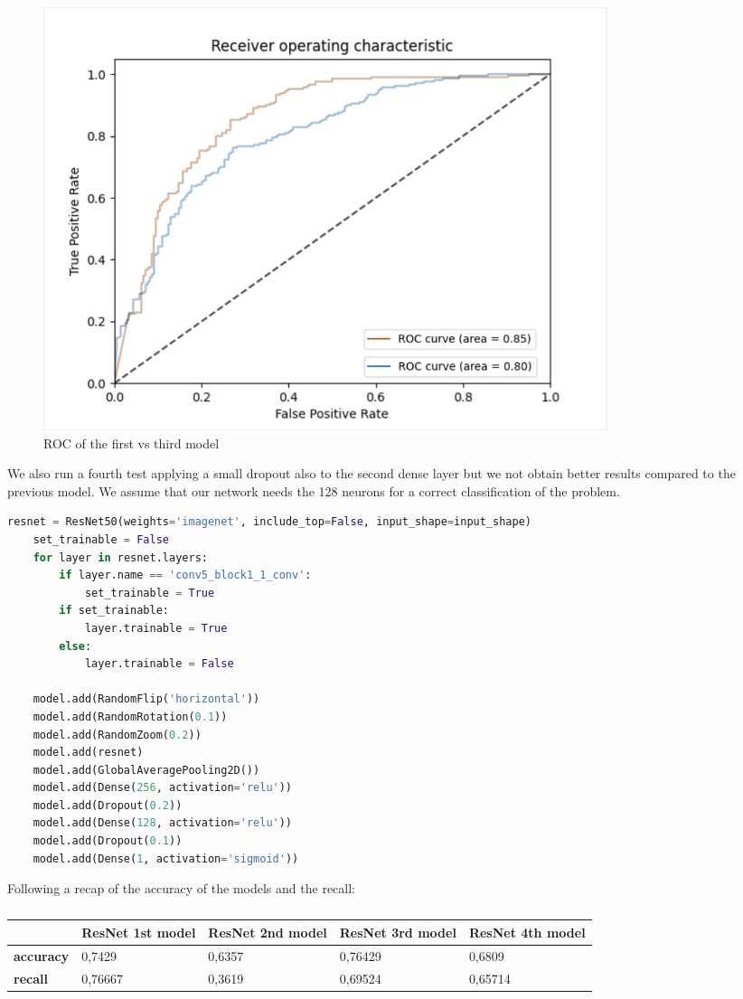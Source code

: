 \begin{figure}[h!]
    \centering
    \includegraphics[width=0.8\textwidth]{images/ROCResnet.png}
    \caption{ROC of the first vs third model}
    \label{fig:ROCResnet}
\end{figure}


We also run a fourth test applying a small dropout also to the second dense layer but we not obtain better results compared to the previous model. We assume that our network needs the 128 neurons for a correct classification of the problem. 
\begin{lstlisting}[language=python, caption={ResNet50 Fourth test}, label={lst:resnet50CodeFourthTest}]
    resnet = ResNet50(weights='imagenet', include_top=False, input_shape=input_shape)
    set_trainable = False
    for layer in resnet.layers:
        if layer.name == 'conv5_block1_1_conv':
            set_trainable = True
        if set_trainable:
            layer.trainable = True
        else:
            layer.trainable = False

    model.add(RandomFlip('horizontal'))
    model.add(RandomRotation(0.1))
    model.add(RandomZoom(0.2))
    model.add(resnet)
    model.add(GlobalAveragePooling2D())
    model.add(Dense(256, activation='relu'))
    model.add(Dropout(0.2))
    model.add(Dense(128, activation='relu'))
    model.add(Dropout(0.1))
    model.add(Dense(1, activation='sigmoid'))
\end{lstlisting}


Following a recap of the accuracy of the models and the recall:

\begin{table}[h!]
\centering
\caption{}
\label{tab:ResNet50}
\begin{tabular}{|l|l|l|l|l|}
\hline
                  & \textbf{ResNet 1st model} & \textbf{ResNet 2nd model} & \textbf{ResNet 3rd model} & \textbf{ResNet 4th model} \\ \hline
\textbf{accuracy} & 0,7429                    & 0,6357                    & 0,76429                   & 0,6809                    \\ \hline
\textbf{recall}   & 0,76667                   & 0,3619                    & 0,69524                   & 0,65714                   \\ \hline
\end{tabular}
\end{table}

